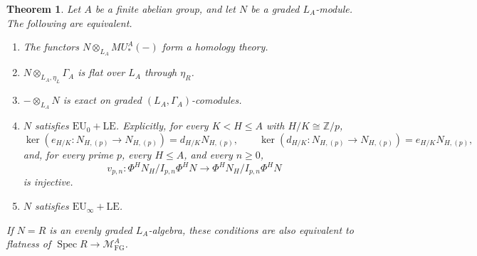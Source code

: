 \documentclass[11pt,reqno]{amsart}
\newtheorem{theorem}{Theorem}[section]
\newcommand{\Spec}{\operatorname{Spec}}
\newcommand{\MFG}{\mathcal M_{\mathrm{FG}}}
\newcommand{\bbZ}{\mathbb Z}
\newcommand{\tensor}{\otimes}
\begin{document}
\begin{theorem}\label{thm:finite equivariant-LEFT}
Let $A$ be a finite abelian group, and let $N$ be a graded $L_{A}$-module.  The following are equivalent.
\begin{enumerate}[label=\textup{(\roman*)}]
\item\label{item:p-homology} The functors $N\tensor_{L_{A}} MU_*^A(-)$ form a homology theory.
\item\label{item:p-flat} $N\tensor_{L_{A},\eta_L}\Gamma_{A}$ is flat over $L_{A}$ through $\eta_R$.
\item\label{item:p-comodule} $-\tensor_{L_{A}}N$ is exact on graded $(L_{A},\Gamma_{A})$-comodules.
\item\label{item:p-criterion} $N$ satisfies $\mathrm{EU}_{0}+\mathrm{LE}$. Explicitly, for every $K<H\leq A$ with $H/K\cong \bbZ/p$,
\[
\ker(e_{H/K}:N_{H,(p)}\to N_{H,(p)})=d_{H/K}N_{H,(p)}, \qquad \ker(d_{H/K}:N_{H,(p)}\to N_{H,(p)})=e_{H/K}N_{H,(p)},
\]
and, for every prime $p$, every $H\leq A$, and every $n\geq0$,
\[
  v_{p,n}:\Phi^H N_H/I_{p,n}\Phi^H N \longrightarrow \Phi^H N_H/I_{p,n}\Phi^H N
\]
is injective.
\item\label{item:p-allheight} $N$ satisfies $\mathrm{EU}_{\infty}+\mathrm{LE}$.
\end{enumerate}
If $N=R$ is an evenly graded $L_{A}$-algebra, these conditions are also equivalent to flatness of $\Spec R\to\MFG^A$.
\end{theorem}
\end{document}

